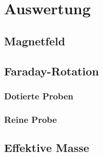 \section{Auswertung}
\label{sec:auswertung}

\cite{matplotlib} \cite{numpy}

\subsection{Magnetfeld}

\subsection{Faraday-Rotation}

\subsubsection{Dotierte Proben}

\subsubsection{Reine Probe}

\subsection{Effektive Masse}
